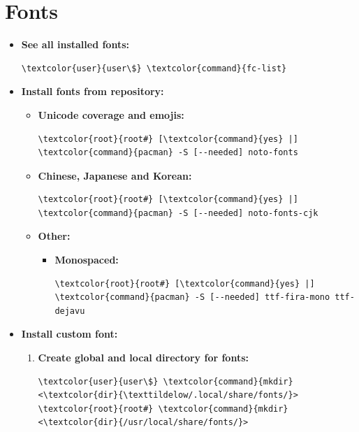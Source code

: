 \documentclass[10pt, a4paper, onecolumn, oneside, titlepage, openany]{book}
\begin{document}
\section{Fonts}
\begin{itemize}
    \item \textbf{See all installed fonts:}
\begin{Verbatim}[commandchars=\\\{\}]
\textcolor{user}{user\$} \textcolor{command}{fc-list}
\end{Verbatim}
    \item \textbf{Install fonts from repository:}
    \begin{itemize}
        \item \textbf{Unicode coverage and emojis:}
\begin{Verbatim}[commandchars=\\\{\}]
\textcolor{root}{root#} [\textcolor{command}{yes} |] \textcolor{command}{pacman} -S [--needed] noto-fonts
\end{Verbatim}        
        \item \textbf{Chinese, Japanese and Korean:}
\begin{Verbatim}[commandchars=\\\{\}]
\textcolor{root}{root#} [\textcolor{command}{yes} |] \textcolor{command}{pacman} -S [--needed] noto-fonts-cjk
\end{Verbatim}
        \item \textbf{Other:}
        \begin{itemize}
            \item \textbf{Monospaced:}
\begin{Verbatim}[commandchars=\\\{\}]
\textcolor{root}{root#} [\textcolor{command}{yes} |] \textcolor{command}{pacman} -S [--needed] ttf-fira-mono ttf-dejavu
\end{Verbatim}
        \end{itemize}
    \end{itemize}
    \item \textbf{Install custom font:}
    \begin{enumerate}
        \item \textbf{Create global and local directory for fonts:}
\begin{Verbatim}[commandchars=\\\{\}]
\textcolor{user}{user\$} \textcolor{command}{mkdir} <\textcolor{dir}{\texttildelow/.local/share/fonts/}>
\textcolor{root}{root#} \textcolor{command}{mkdir} <\textcolor{dir}{/usr/local/share/fonts/}>

\end{Verbatim}
\end{enumerate}
\end{itemize}
\end{document}
